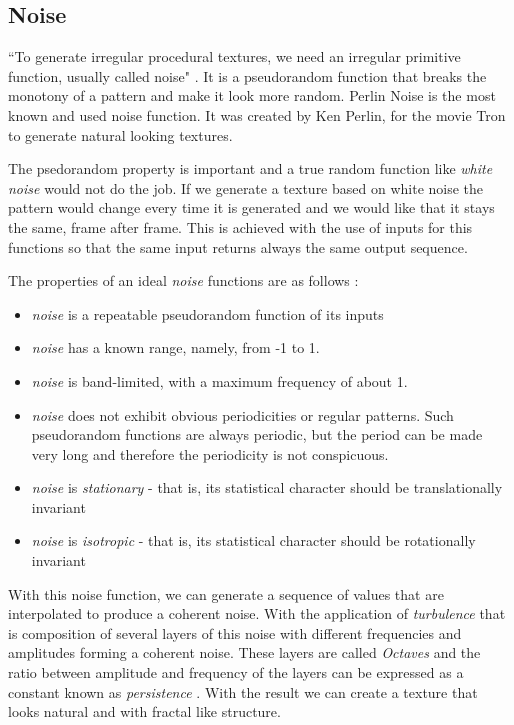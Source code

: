 
\subsection{Noise} %
\label{sub:noise}


``To generate irregular procedural textures, we need an irregular primitive function, usually called noise" \cite{Ebert2002}. It is a pseudorandom function that breaks the monotony of a pattern and make it look more random.
Perlin Noise is the most known and used noise function. It was created by Ken Perlin, for the movie Tron to generate natural looking textures.

The psedorandom property is important and a true random function like \emph{white noise} would not do the job. If we generate a texture based on white noise the pattern would change every time it is generated and we would like that it stays the same, frame after frame. This is achieved with the use of inputs for this functions so that the same input returns always the same output sequence. 

The properties of an ideal \emph{noise} functions are as follows \cite{Ebert2002}:
\begin{itemize}
	\item \emph{noise} is a repeatable pseudorandom function of its inputs
	\item \emph{noise} has a known range, namely, from -1 to 1.
	\item \emph{noise} is band-limited, with a maximum frequency of about 1.
	\item \emph{noise} does not exhibit obvious periodicities or regular patterns. Such pseudorandom functions are always periodic, but the period can be made very long and therefore the periodicity is not conspicuous.
	\item \emph{noise} is \emph{stationary} - that is, its statistical character should be translationally invariant
	\item \emph{noise} is \emph{isotropic} - that is, its statistical character should be rotationally invariant
\end{itemize}

With this noise function, we can generate a sequence of values that are interpolated to produce a coherent noise. With the application of \emph{turbulence} that is composition of several layers of this noise with different frequencies and amplitudes forming a coherent noise. These layers are called \emph{Octaves} and the ratio between amplitude and frequency of the layers can be expressed as a constant known as \emph{persistence} \cite{Kelly2008}. With the result we can create a texture that looks natural and with fractal like structure.

